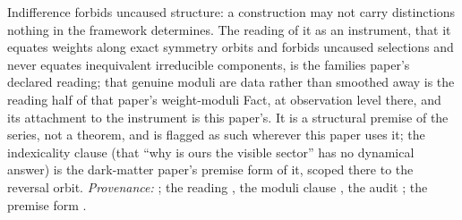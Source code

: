 Indifference forbids uncaused structure: a construction may not carry distinctions nothing in the framework determines. The reading of it as an instrument, that it equates weights along exact symmetry orbits and forbids uncaused selections and never equates inequivalent irreducible components, is the families paper's declared reading; that genuine moduli are data rather than smoothed away is the reading half of that paper's weight-moduli Fact, at observation level there, and its attachment to the instrument is this paper's. It is a structural premise of the series, not a theorem, and is flagged as such wherever this paper uses it; the indexicality clause (that ``why is ours the visible sector'' has no dynamical answer) is the dark-matter paper's premise form of it, scoped there to the reversal orbit. \emph{Provenance:} \cite[Principle~5.4]{ButlerT8}; the reading \cite[Fact~2.5]{ButlerT13}, the moduli clause \cite[Fact~2.4]{ButlerT13}, the audit \cite[\S5]{ButlerT13}; the premise form \cite[Premise~2.2]{ButlerT14}.
